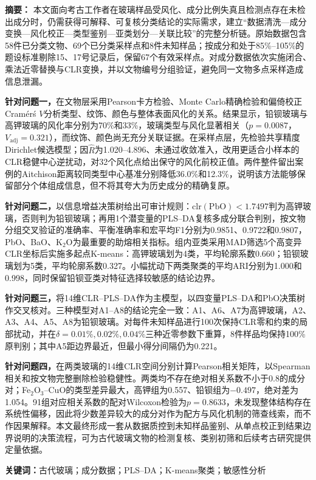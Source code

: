 \begin{center}
  {\heiti{}\PaperTitle\par}
\end{center}
\vspace{0.6em}

\noindent\textbf{摘要：}
本文面向考古工作者在玻璃样品受风化、成分比例失真且检测点存在未检出成分时，仍需获得可解释、可复核分类结论的实际需求，建立“数据清洗—成分变换—风化校正—类型鉴别—亚类划分—关联比较”的完整分析链。原始数据包含58件已分类文物、69个已分类采样点和8件未知样品；按成分和处于85\%--105\%的题设标准剔除15、17号记录后，保留67个有效采样点。对成分数据依次实施闭合、乘法近零替换与CLR变换，并以文物编号分组验证，避免同一文物多点采样造成信息泄漏。

\textbf{针对问题一，}在文物层采用Pearson卡方检验、Monte Carlo精确检验和偏倚校正Cram\'er\'s $V$分析类型、纹饰、颜色与整体表面风化的关系。结果显示，铅钡玻璃与高钾玻璃的风化率分别为70\%和33\%，玻璃类型与风化显著相关（$p=0.0087$，$V_{\mathrm{adj}}=0.321$），而纹饰、颜色尚无充分关联证据。在采样点层，先检验共享精度Dirichlet候选模型；因$\hat R$为1.020--4.896、未通过收敛准入，改用更适合小样本的CLR稳健中心逆扰动，对32个风化点给出保守的风化前校正值。两件整件留出案例的Aitchison距离较同类型中心基准分别降低36.0\%和12.3\%，说明该方法能够保留部分个体组成信息，但不将其夸大为历史成分的精确复原。

\textbf{针对问题二，}以信息增益决策树给出可审计规则：$\mathrm{clr}(\mathrm{PbO})<1.7497$判为高钾玻璃，否则判为铅钡玻璃；再用1个潜变量的PLS--DA复核多成分联合判别，按文物分组交叉验证的准确率、平衡准确率和宏平均F1分别为0.9851、0.9722和0.9807，PbO、BaO、K$_2$O为最重要的助熔相关指标。组内亚类采用MAD筛选5个高变异CLR坐标后实施多起点K-means：高钾玻璃划为4类，平均轮廓系数0.660；铅钡玻璃划为5类，平均轮廓系数0.327。小幅扰动下两类聚类的平均ARI分别为1.000和0.998，同时保留铅钡亚类对特征选择较敏感的结论边界。

\textbf{针对问题三，}将14维CLR--PLS--DA作为主模型，以四变量PLS--DA和PbO决策树作交叉核对。三种模型对A1--A8的结论完全一致：A1、A6、A7为高钾玻璃，A2、A3、A4、A5、A8为铅钡玻璃。对每件未知样品进行100次保持CLR零和约束的局部扰动，并在$\delta=0.01\%,0.02\%,0.04\%$三种近零参数下重算，8件样品均保持100\%原判别；其中A5距边界最近，但最小得分间隔仍为0.221。

\textbf{针对问题四，}在两类玻璃的14维CLR空间分别计算Pearson相关矩阵，以Spearman相关和按文物完整删除检验稳健性。两类均不存在绝对相关系数不小于0.8的成分对；Fe$_2$O$_3$--CuO的类型差异最大，高钾组为0.557、铅钡组为$-0.497$，绝对差为1.054。91组对应相关系数的配对Wilcoxon检验为$p=0.8633$，未发现整体结构存在系统性偏移，因此将少数差异较大的成分对作为配方与风化机制的筛查线索，而不作因果解释。本文最终形成一套从数据质控到未知样品鉴别、从单点校正到结果边界说明的决策流程，可为古代玻璃文物的检测复核、类别初筛和后续考古研究提供定量依据。

\vspace{0.6em}
\noindent\textbf{关键词：}古代玻璃；成分数据；PLS--DA；K-means聚类；敏感性分析

